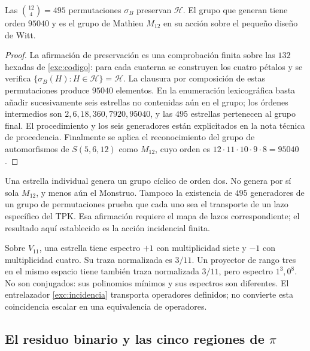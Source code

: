 \begin{proposition}
\label{exc:m12}
Las $\binom{12}4=495$ permutaciones $\sigma_B$ preservan $\mathcal H$.
El grupo que generan tiene orden $95040$ y es el grupo de Mathieu
$M_{12}$ en su acción sobre el pequeño diseño de Witt.
\end{proposition}

\begin{proof}
La afirmación de preservación es una comprobación finita sobre las
$132$ hexadas de \eqref{exc:codigo}: para cada cuaterna se construyen
los cuatro pétalos y se verifica
$\{\sigma_B(H):H\in\mathcal H\}=\mathcal H$.
La clausura por composición de estas permutaciones produce $95040$
elementos. En la enumeración lexicográfica basta añadir sucesivamente
seis estrellas no contenidas aún en el grupo; los órdenes intermedios
son $2,6,18,360,7920,95040$, y las $495$ estrellas pertenecen al grupo
final. El procedimiento y los seis generadores están explicitados en
la nota técnica de procedencia. Finalmente se aplica el reconocimiento
del grupo de automorfismos de $S(5,6,12)$ como $M_{12}$, cuyo orden es
$12\cdot11\cdot10\cdot9\cdot8=95040$.
\end{proof}

Una estrella individual genera un grupo cíclico de orden dos. No
genera por sí sola $M_{12}$, y menos aún el Monstruo. Tampoco la
existencia de $495$ generadores de un grupo de permutaciones prueba que
cada uno sea el transporte de un lazo específico del TPK. Esa afirmación
requiere el mapa de lazos correspondiente; el resultado aquí establecido
es la acción incidencial finita.

\begin{remark}
Sobre $V_{11}$, una estrella tiene espectro $+1$ con multiplicidad siete
y $-1$ con multiplicidad cuatro. Su traza normalizada es $3/11$.
Un proyector de rango tres en el mismo espacio tiene también traza
normalizada $3/11$, pero espectro $1^3,0^8$. No son conjugados: sus
polinomios mínimos y sus espectros son diferentes. El entrelazador
\eqref{exc:incidencia} transporta operadores definidos; no convierte
esta coincidencia escalar en una equivalencia de operadores.
\end{remark}

\subsection{El residuo binario y las cinco regiones de \texorpdfstring{$\pi$}{pi}}
\label{exc:cinco-regiones}

